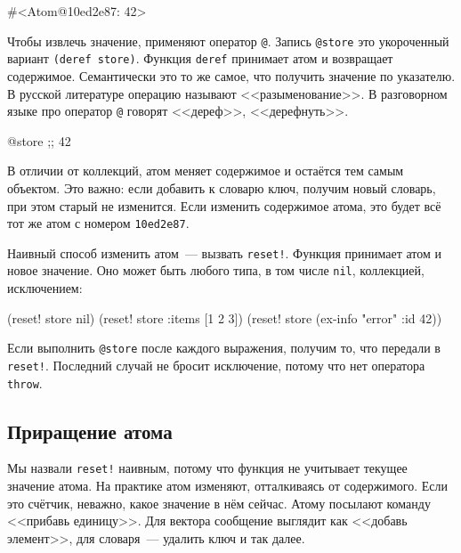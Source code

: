 \begin{english}
  \begin{clojure}
#<Atom@10ed2e87: 42>
  \end{clojure}
\end{english}

Чтобы извлечь значение, применяют оператор \verb|@|. Запись \verb|@store|
это укороченный вариант \verb|(deref store)|. Функция \verb|deref| принимает
атом и возвращает содержимое. Семантически это то же самое, что получить
значение по указателю. В русской литературе операцию называют
<<разыменование>>. В разговорном языке про оператор \verb|@| говорят
<<дереф>>, <<дерефнуть>>.


\begin{english}
  \begin{clojure}
@store ;; 42
  \end{clojure}
\end{english}

В отличии от коллекций, атом меняет содержимое и остаётся тем самым
объектом. Это важно: если добавить к словарю ключ, получим новый словарь, при
этом старый не изменится. Если изменить содержимое атома, это будет всё тот
же атом с номером \verb|10ed2e87|.


Наивный способ изменить атом~--- вызвать \verb|reset!|. Функция принимает атом
и новое значение. Оно может быть любого типа, в том числе \verb|nil|,
коллекцией, исключением:

\begin{english}
  \begin{clojure}
(reset! store nil)
(reset! store {:items [1 2 3]})
(reset! store (ex-info "error" {:id 42}))
  \end{clojure}
\end{english}

Если выполнить \verb|@store| после каждого выражения, получим то, что передали
в \verb|reset!|. Последний случай не бросит исключение, потому что нет
оператора \verb|throw|.

\subsection{Приращение атома}


Мы назвали \verb|reset!| наивным, потому что функция не учитывает текущее
значение атома. На практике атом изменяют, отталкиваясь от содержимого. Если это
счётчик, неважно, какое значение в нём сейчас. Атому посылают команду <<прибавь
единицу>>. Для вектора сообщение выглядит как <<добавь элемент>>, для
словаря~--- удалить ключ и так далее.

